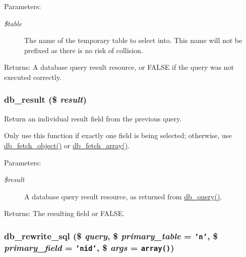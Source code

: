 \begin{Desc}
\item[Parameters:]
\begin{description}
\item[{\em \$table}]The name of the temporary table to select into. This name will not be prefixed as there is no risk of collision. \end{description}
\end{Desc}
\begin{Desc}
\item[Returns:]A database query result resource, or FALSE if the query was not executed correctly. \end{Desc}
\hypertarget{group__database_g953354ea01b236440b187210dc18aad9}{
\subsubsection[{db\_\-result}]{\setlength{\rightskip}{0pt plus 5cm}db\_\-result (\$ {\em result})}}
\label{group__database_g953354ea01b236440b187210dc18aad9}


Return an individual result field from the previous query.

Only use this function if exactly one field is being selected; otherwise, use \hyperlink{database_8mysql_8inc_5faaeba7105d28828db453b4fd3c75d4}{db\_\-fetch\_\-object()} or \hyperlink{database_8mysql_8inc_2bd5f98fec7f21ee2c37f6b83785dcb9}{db\_\-fetch\_\-array()}.

\begin{Desc}
\item[Parameters:]
\begin{description}
\item[{\em \$result}]A database query result resource, as returned from \hyperlink{database_8mysql-common_8inc_9e096321b86945d128746ac7bedce8f3}{db\_\-query()}. \end{description}
\end{Desc}
\begin{Desc}
\item[Returns:]The resulting field or FALSE. \end{Desc}
\hypertarget{group__database_g0869f72f75d16bd0f9a52eaafa02e091}{
\subsubsection[{db\_\-rewrite\_\-sql}]{\setlength{\rightskip}{0pt plus 5cm}db\_\-rewrite\_\-sql (\$ {\em query}, \/  \$ {\em primary\_\-table} = {\tt 'n'}, \/  \$ {\em primary\_\-field} = {\tt 'nid'}, \/  \$ {\em args} = {\tt array()})}}
\label{group__database_g0869f72f75d16bd0f9a52eaafa02e091}


